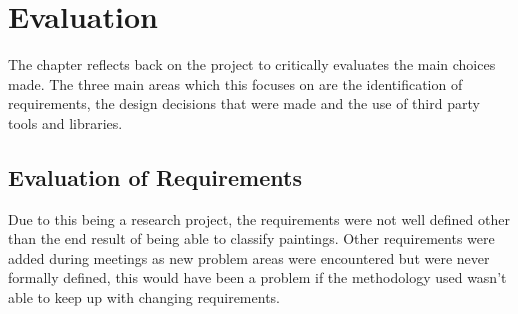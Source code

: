 \chapter{Evaluation}

The chapter reflects back on the project to critically evaluates the main choices made. The three
main areas which this focuses on are the identification of requirements, the design decisions that
were made and the use of third party tools and libraries.





\section{Evaluation of Requirements}
Due to this being a research project, the requirements were not well defined other than the end 
result of being able to classify paintings. Other requirements were added during meetings as new
problem areas were encountered but were never formally defined, this would have been a problem if 
the methodology used wasn't able to keep up with changing requirements.

